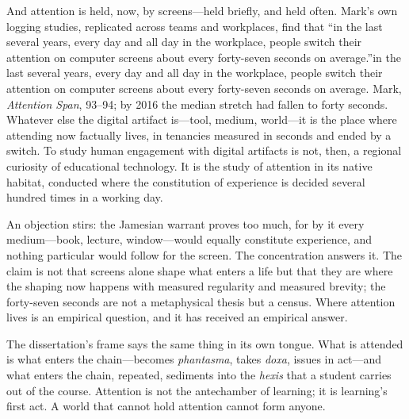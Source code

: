 And attention is held, now, by screens---held briefly, and held often. Mark's own logging studies, replicated across teams and workplaces, find that ``in the last several years, every day and all day in the workplace, people switch their attention on computer screens about every forty-seven seconds on average.''in the last several years, every day and all day in the workplace, people switch their attention on computer screens about every forty-seven seconds on average. Mark, \textit{Attention Span}, 93--94; by 2016 the median stretch had fallen to forty seconds. Whatever else the digital artifact is---tool, medium, world---it is the place where attending now factually lives, in tenancies measured in seconds and ended by a switch. To study human engagement with digital artifacts is not, then, a regional curiosity of educational technology. It is the study of attention in its native habitat, conducted where the constitution of experience is decided several hundred times in a working day.

An objection stirs: the Jamesian warrant proves too much, for by it every medium---book, lecture, window---would equally constitute experience, and nothing particular would follow for the screen. The concentration answers it. The claim is not that screens alone shape what enters a life but that they are where the shaping now happens with measured regularity and measured brevity; the forty-seven seconds are not a metaphysical thesis but a census. Where attention lives is an empirical question, and it has received an empirical answer.

The dissertation's frame says the same thing in its own tongue. What is attended is what enters the chain---becomes \textit{phantasma}, takes \textit{doxa}, issues in act---and what enters the chain, repeated, sediments into the \textit{hexis} that a student carries out of the course. Attention is not the antechamber of learning; it is learning's first act. A world that cannot hold attention cannot form anyone.

